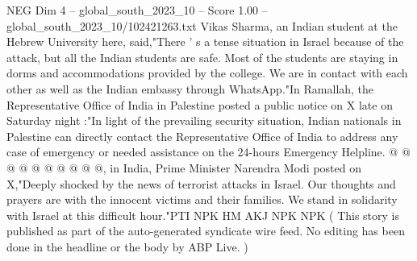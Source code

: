 \begin{textsample}{NEG Dim 4 – global\_south\_2023\_10 – Score 1.00 – global\_south\_2023\_10/102421263.txt}
Vikas Sharma, an Indian student at the Hebrew University here, said,"There ' s a tense situation in Israel because of the attack, but all the Indian students are safe.
Most of the students are staying in dorms and accommodations provided by the college.
We are in contact with each other as well as the Indian embassy through WhatsApp."In Ramallah, the Representative Office of India in Palestine posted a public notice on X late on Saturday night :"In light of the prevailing security situation, Indian nationals in Palestine can directly contact the Representative Office of India to address any case of emergency or needed assistance on the 24-hours Emergency Helpline. @ @ @ @ @ @ @ @ @ @, in India, Prime Minister Narendra Modi posted on X,"Deeply shocked by the news of terrorist attacks in Israel.
Our thoughts and prayers are with the innocent victims and their families.
We stand in solidarity with Israel at this difficult hour."PTI NPK HM AKJ NPK NPK ( This story is published as part of the auto-generated syndicate wire feed.
No editing has been done in the headline or the body by ABP Live. )

\end{textsample}
